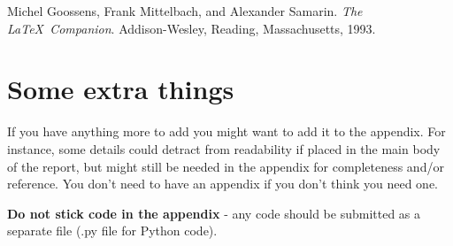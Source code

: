 \documentclass[12pt]{article}
\begin{document}

\begin{thebibliography}{3}

Michel Goossens, Frank Mittelbach, and Alexander Samarin. \textit{The \LaTeX\ Companion}. Addison-Wesley, Reading, Massachusetts, 1993.

\end{thebibliography}


\appendix

\renewcommand{\thesection}{Appendix \Alph{section}}

\section{Some extra things}

If you have anything more to add you might want to add it to the appendix.  For instance, some details could detract from readability if placed in the main body of the report, but might still be needed in the appendix for completeness and/or reference.  You don't need to have an appendix if you don't think you need one.

\textbf{Do not stick code in the appendix} - any code should be submitted as a separate file (.py file for Python code).  
\end{document}
